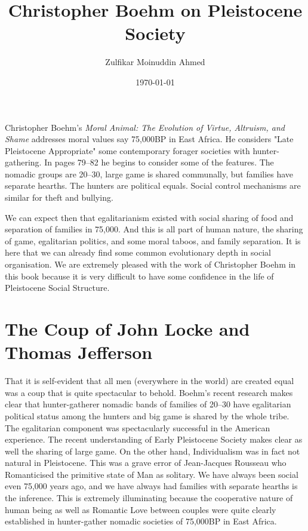 \documentclass{amsart}
\title{Christopher Boehm on Pleistocene Society}
\author{Zulfikar Moinuddin Ahmed}
\date{\today}
\begin{document}
\maketitle


Christopher Boehm's {\em Moral Animal: The Evolution of Virtue, Altruism, and Shame} addresses moral values say 75,000BP in East Africa.  He considers "Late Pleistocene Appropriate" some contemporary forager societies with hunter-gathering.  In pages 79--82 he begins to consider some of the features.  The nomadic groups are 20--30, large game is shared communally, but families have separate hearths.  The hunters are political equals.  Social control mechanisms are similar for theft and bullying.

We can expect then that egalitarianism existed with social sharing of food and separation of families in 75,000.  And this is all part of human nature, the sharing of game, egalitarian politics, and some moral taboos, and family separation. It is here that we can already find some common evolutionary depth in social organisation.  We are extremely pleased with the work of Christopher Boehm in this book because it is very difficult to have some confidence in the life of Pleistocene Social Structure.

\section{The Coup of John Locke and Thomas Jefferson}

That it is self-evident that all men (everywhere in the world) are created equal was a coup that is quite spectacular to behold.  Boehm's recent research makes clear that hunter-gatherer nomadic bands of families of 20--30 have egalitarian political status among the hunters and big game is shared by the whole tribe.  The egalitarian component was spectacularly successful in the American experience.  The recent understanding of Early Pleistocene Society makes clear as well the sharing of large game.  On the other hand, Individualism was in fact not natural in Pleistocene. This was a grave error of Jean-Jacques Rousseau who Romanticised the primitive state of Man as solitary.  We have always been social even 75,000 years ago, and we have always had families with separate hearths is the inference.  This is extremely illuminating because the cooperative nature of human being as well as Romantic Love between couples were quite clearly established in hunter-gather nomadic societies of 75,000BP in East Africa.
\end{document}
